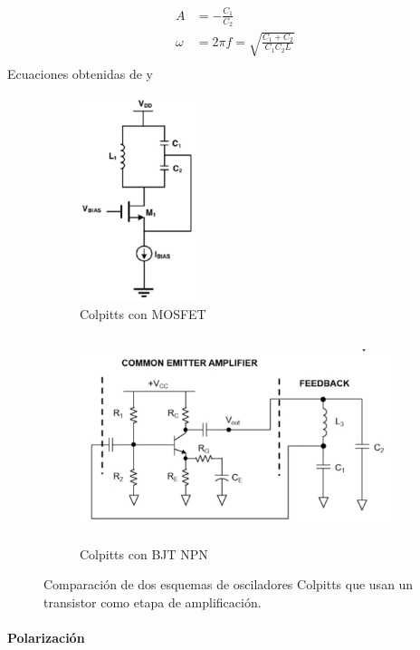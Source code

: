 \begin{align}
    \label{eq:2}
    A &= -\frac{C_1}{C_2} \\    
    \omega &= 2\pi f = \sqrt{\frac{C_1+C_2}{C_1C_2L}} \\
\end{align} Ecuaciones obtenidas de \cite{notasCurso} y \cite{aaron_danner_colpitts_2023}

\begin{figure}[H]
    \begin{subfigure}{0.3\textwidth}
        \centering
        \includegraphics[height=6cm]{Images/2.png} 
            \caption{Colpitts con MOSFET}
    \end{subfigure}
    \begin{subfigure}{0.7\textwidth}
       \centering
        \includegraphics[height=6cm]{Images/3.png}
        \caption{Colpitts con BJT NPN}
    \end{subfigure}
    \caption{Comparación de dos esquemas de osciladores Colpitts que usan un transistor como etapa de amplificación.}
    \label{fig:0z0z2:1}
\end{figure}

\paragraph{Polarización}

